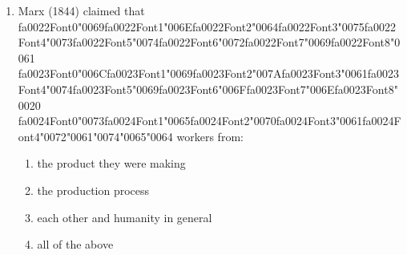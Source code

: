 \documentclass[12pt]{article}
\begin{document}
\begin{enumerate}[label=\arabic*.]
\begin{enumerate}[label=(\alph*)]
    \item Prime Minister, Archbishop of York, Viscounts of England
    \item Marquesses of England, Earls of Great Britain, King's Brothers
    \item Esquires, Serjeants of Law, Dukes' Eldest Sons
    \item King's Grandsons, Lord High Treasurer, Companions of the Bath
\end{enumerate}
\item Marx (1844) claimed that {\csname fa0022Font0\endcsname\char"0069}{\csname fa0022Font1\endcsname\char"006E}{\csname fa0022Font2\endcsname\char"0064}{\csname fa0022Font3\endcsname\char"0075}{\csname fa0022Font4\endcsname\char"0073}{\csname fa0022Font5\endcsname\char"0074}{\csname fa0022Font6\endcsname\char"0072}{\csname fa0022Font7\endcsname\char"0069}{\csname fa0022Font8\endcsname\char"0061} {\csname fa0023Font0\endcsname\char"006C}{\csname fa0023Font1\endcsname\char"0069}{\csname fa0023Font2\endcsname\char"007A}{\csname fa0023Font3\endcsname\char"0061}{\csname fa0023Font4\endcsname\char"0074}{\csname fa0023Font5\endcsname\char"0069}{\csname fa0023Font6\endcsname\char"006F}{\csname fa0023Font7\endcsname\char"006E}{\csname fa0023Font8\endcsname\char"0020} {\csname fa0024Font0\endcsname\char"0073}{\csname fa0024Font1\endcsname\char"0065}{\csname fa0024Font2\endcsname\char"0070}{\csname fa0024Font3\endcsname\char"0061}{\csname fa0024Font4\endcsname\char"0072}{\char"0061}{\char"0074}{\char"0065}{\char"0064} workers from:
\begin{enumerate}[label=(\alph*)]
    \item the product they were making
    \item the production process
    \item each other and humanity in general
    \item all of the above
\end{enumerate}
\end{enumerate}
\end{document}
